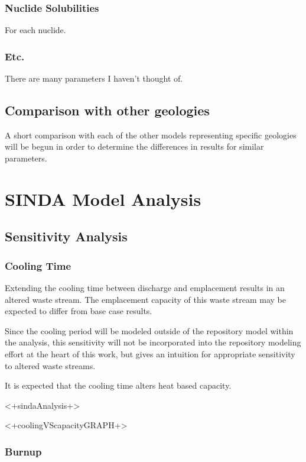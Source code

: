 \subsubsection{Nuclide Solubilities}

For each nuclide.

\subsubsection{Etc. }

There are many parameters I haven't thought of.

\subsection{Comparison with other geologies}

A short comparison with each of the other models representing specific geologies 
will be begun in order to determine the differences in results for similar 
parameters.


\section{SINDA Model Analysis}
\subsection{Sensitivity Analysis}
\subsubsection{Cooling Time}

Extending the cooling time between discharge and emplacement results
in an altered waste stream. The emplacement capacity
of this waste stream may be expected to differ from base case results. 

Since the cooling period will be modeled outside of the repository model within  
the \Cyclus analysis, this sensitivity will not be incorporated into the 
repository modeling effort at the heart of this work, but gives an intuition for 
appropriate sensitivity to altered waste streams.

It is expected that the cooling time alters heat based capacity. 

<+sindaAnalysis+>

<+coolingVScapacityGRAPH+>

\subsubsection{Burnup}

